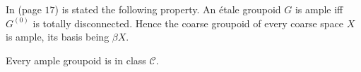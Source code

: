 In \cite{paterson} (page $17$) is stated the following property. An étale groupoid $G$ is ample iff $G^{(0)}$ is totally disconnected. Hence the coarse groupoid of every coarse space $X$ is ample, its basis being $\beta X$.

\begin{prop}
Every ample groupoid is in class $\mathcal C$.
\end{prop}



